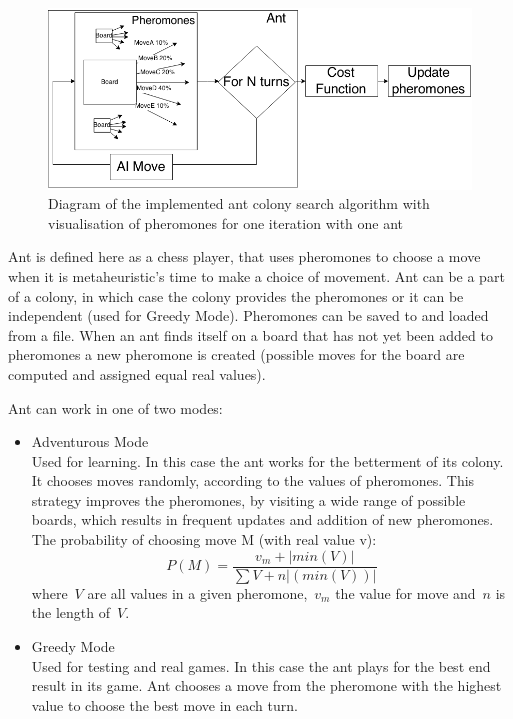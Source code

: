 \documentclass[pdftex]{article}
\begin{document}
\begin{figure}[!htb]
	\centering
	\includegraphics[width=1\textwidth]{ant/pheromones.png} 
	\caption{Diagram of the implemented ant colony search algorithm with visualisation of pheromones for one iteration with one ant}
	\label{fig:pheromones}
\end{figure}

Ant is defined here as a chess player, that uses pheromones to choose a move when it is metaheuristic's time to make a choice of movement. Ant can be a part of a colony, in which case the colony provides the pheromones or it can be independent (used for Greedy Mode). Pheromones can be saved to and loaded from a file. When an ant finds itself on a board that has not yet been added to pheromones a new pheromone is created (possible moves for the board are computed and assigned equal real values).

 Ant can work in one of two modes: 
\begin{itemize}
 	\item Adventurous Mode \hfill \\
		Used for learning. In this case the ant works for the betterment of its colony. It chooses moves randomly, according to the values of pheromones. This strategy improves the pheromones, by visiting a wide range of possible boards, which results in frequent updates and addition of new pheromones. The probability of choosing move M (with real value v):
\begin{equation}
\label{eq:choosingequation}
	P(M) = \frac{v_m + |min(V)|}{\sum V + n|(min(V))|}
\end{equation}
where~$V$ are all values in a given pheromone,~$v_m$ the value for move and~$n$ is the length of~$V$.

	\item Greedy Mode \hfill \\
		Used for testing and real games. In this case the ant plays for the best end result in its game. Ant chooses a move from the pheromone with the highest value to choose the best move in each turn.
\end{itemize}
\end{document}
